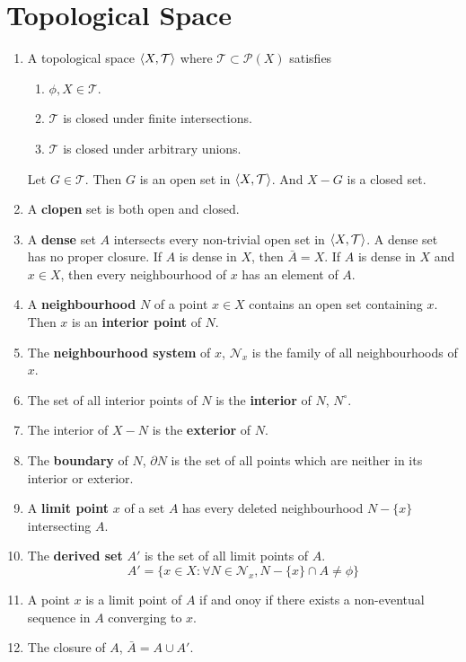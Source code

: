 \section{Topological Space}
\begin{enumerate}
	\item A topological space $\left\langle X,\mathcal{T} \right\rangle$ where $\mathcal{T} \subset \mathcal{P}(X)$ satisfies
	\begin{enumerate}
		\item $\phi,X \in \mathcal{T}$.
		\item $\mathcal{T}$ is closed under finite intersections.
		\item $\mathcal{T}$ is closed under arbitrary unions.
	\end{enumerate}
	Let $G \in \mathcal{T}$.
	Then $G$ is an open set in $\left\langle X,\mathcal{T} \right\rangle$.
	And $X-G$ is a closed set.
	\item A \textbf{clopen} set is both open and closed.
	\item A \textbf{dense} set $A$ intersects every non-trivial open set in $\left\langle X,\mathcal{T} \right\rangle$.
		\subitem A dense set has no proper closure.
		\subitem If $A$ is dense in $X$, then $\bar{A} = X$.
		\subitem If $A$ is dense in $X$ and $x \in X$, then every neighbourhood of $x$ has an element of $A$.
	\item A \textbf{neighbourhood} $N$ of a point $x \in X$ contains an open set containing $x$.
		\subitem Then $x$ is an \textbf{interior point} of $N$.
	\item The \textbf{neighbourhood system} of $x$, $\mathcal{N}_x$ is the family of all neighbourhoods of $x$.
	\item The set of all interior points of $N$ is the \textbf{interior} of $N$, $N^\circ$.
	\item The interior of $X-N$ is the \textbf{exterior} of $N$.
	\item The \textbf{boundary} of $N$, $\partial N$ is the set of all points which are neither in its interior or exterior.
	\item A \textbf{limit point} $x$ of a set $A$ has every deleted neighbourhood $N-\{x\}$ intersecting $A$.
	\item The \textbf{derived set} $A'$ is the set of all limit points of $A$.
	$$A' = \{ x \in X : \forall N \in \mathcal{N}_x, N-\{x\} \cap A \ne \phi \}$$
	\item A point $x$ is a limit point of $A$ if and onoy if there exists a non-eventual sequence in $A$ converging to $x$.
	\item The closure of $A$, $\bar{A} = A \cup A'$.

\end{enumerate}
